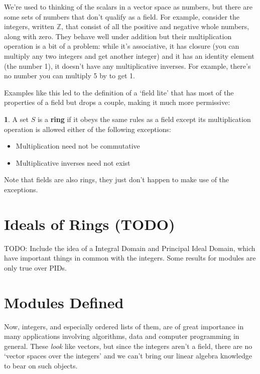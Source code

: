 \documentclass[oneside,english]{amsbook}
\numberwithin{section}{chapter}
\theoremstyle{plain}
\theoremstyle{definition}
\newtheorem{defn}[thm]{\protect\definitionname}
\providecommand{\definitionname}{Definition}
\begin{document}
			We're used to thinking of the scalars in a vector space as numbers, but there are some sets of numbers that don't qualify as a field. For example, consider the integers, written $\mathbb{Z}$, that consist of all the positive and negative whole numbers, along with zero. They behave well under addition but their multiplication operation is a bit of a problem: while it's associative, it has closure (you can multiply any two integers and get another integer) and it has an identity element (the number 1), it doesn't have any multiplicative inverses. For example, there's no number you can multiply 5 by to get 1.
			
			Examples like this led to the definition of a `field lite' that has most of the properties of a field but drops a couple, making it much more permissive:
		
			\begin{defn}
				A set $S$ is a \textbf{ring} if it obeys the same rules as a field except its multiplication operation is allowed either of the following exceptions:
				\begin{itemize}
					\item Multiplication need not be commutative
					\item Multiplicative inverses need not exist
					\end{itemize}
			\end{defn}
			
			Note that fields are also rings, they just don't happen to make use of the exceptions. 
		
		\section{Ideals of Rings (TODO)}
		
			TODO: Include the idea of a Integral Domain and Principal Ideal Domain, which have important things in common with the integers. Some results for modules are only true over PIDs.
		
		\section{Modules Defined}
				
			Now, integers, and especially ordered lists of them, are of great importance in many applications involving algorithms, data and computer programming in general. These \emph{look} like vectors, but since the integers aren't a field, there are no `vector spaces over the integers' and we can't bring our linear algebra knowledge to bear on such objects. 
			
\end{document}
